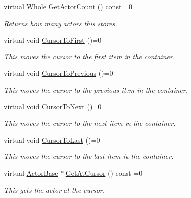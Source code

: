 \begin{DoxyCompactItemize}
virtual \hyperlink{namespacephys_a460f6bc24c8dd347b05e0366ae34f34a}{Whole} \hyperlink{classphys_1_1ActorContainerBase_aa5ec651d4634b2d90efe2a76f9d2fbdd}{GetActorCount} () const =0
\begin{DoxyCompactList}\small\item\em Returns how many actors this stores. \item\end{DoxyCompactList}\item 
virtual void \hyperlink{classphys_1_1ActorContainerBase_ab1a44758d7c17e70ff2e0f8de47424c3}{CursorToFirst} ()=0
\begin{DoxyCompactList}\small\item\em This moves the cursor to the first item in the container. \item\end{DoxyCompactList}\item 
virtual void \hyperlink{classphys_1_1ActorContainerBase_a7c424168c0bbd973b283a083714123b3}{CursorToPrevious} ()=0
\begin{DoxyCompactList}\small\item\em This moves the cursor to the previous item in the container. \item\end{DoxyCompactList}\item 
virtual void \hyperlink{classphys_1_1ActorContainerBase_a1aa337456a4e74cb5740dbae08778072}{CursorToNext} ()=0
\begin{DoxyCompactList}\small\item\em This moves the cursor to the next item in the container. \item\end{DoxyCompactList}\item 
virtual void \hyperlink{classphys_1_1ActorContainerBase_afad072e018a04c190e5e5fb93b82b354}{CursorToLast} ()=0
\begin{DoxyCompactList}\small\item\em This moves the cursor to the last item in the container. \item\end{DoxyCompactList}\item 
virtual \hyperlink{classphys_1_1ActorBase}{ActorBase} $\ast$ \hyperlink{classphys_1_1ActorContainerBase_a2c8fb86a9e188aece105b2a753ccc19a}{GetAtCursor} () const =0
\begin{DoxyCompactList}\small\item\em This gets the actor at the cursor. \item\end{DoxyCompactList}\item 

\end{DoxyCompactItemize}
